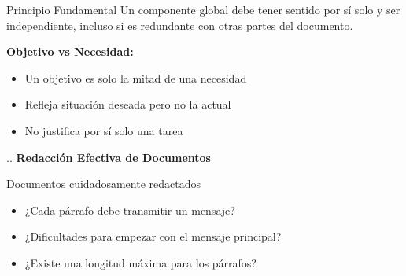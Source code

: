 \documentclass{beamer}
\begin{document}
\vspace{0.5cm}
\begin{block}{Principio Fundamental}
Un componente global debe tener sentido por sí solo y ser independiente, incluso si es redundante con otras partes del documento.
\end{block}

\vspace{0.3cm}
\vspace{0.2cm}
\textbf{Objetivo vs Necesidad:}
\begin{itemize}
    \item Un objetivo es solo la mitad de una necesidad
    \item Refleja situación deseada pero no la actual
    \item No justifica por sí solo una tarea
\end{itemize}

\begin{frame}{ .. }
\centering
\vspace{0.5cm} %
{\Huge \textbf{Redacción Efectiva de Documentos}}
\end{frame}

\begin{frame}{Documentos cuidadosamente redactados}
\begin{itemize}
  \item ¿Cada párrafo debe transmitir un mensaje?
  \item ¿Dificultades para empezar con el mensaje principal?
  \item ¿Existe una longitud máxima para los párrafos?
\end{itemize}
\end{frame}
\end{document}
